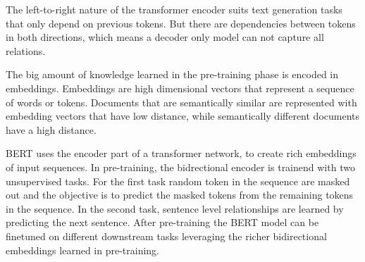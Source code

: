 \documentclass[../../main.tex]{subfiles}
\begin{document}
The left-to-right nature of the transformer encoder suits text generation tasks that only depend on previous tokens.
But there are dependencies between tokens in both directions, which means a decoder only model can not capture all relations.

The big amount of knowledge learned in the pre-training phase is encoded in embeddings.
Embeddings are high dimensional vectors that represent a sequence of words or tokens.
Documents that are semantically similar are represented with embedding vectors that have low distance, while semantically different documents have a high distance.

BERT \cite{Devlin2019} uses the encoder part of a transformer network, to create rich embeddings of input sequences.
In pre-training, the bidrectional encoder is trainend with two unsupervised tasks.
For the first task random token in the sequence are masked out and the objective is to predict the masked tokens from the remaining tokens in the sequence.
In the second task, sentence level relationships are learned by predicting the next sentence.
After pre-training the BERT model can be finetuned on different downstream tasks leveraging the richer bidirectional embeddings learned in pre-training.
\end{document}
